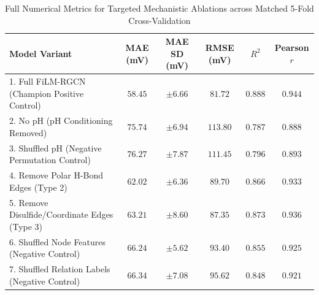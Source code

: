 \begin{table}[htbp]
\centering
\caption{Full Numerical Metrics for Targeted Mechanistic Ablations across Matched 5-Fold Cross-Validation}
\label{tab:s1_ablations}
\small
\begin{tabular*}{\textwidth}{@{\extracolsep{\fill}}lccccc@{}}
\toprule
Model Variant & MAE (mV) & MAE SD (mV) & RMSE (mV) & $R^2$ & Pearson $r$ \\
\midrule
1. Full FiLM-RGCN (Champion Positive Control) & $\mathbf{58.45}$ & $\pm 6.66$ & $\mathbf{81.72}$ & $\mathbf{0.888}$ & $\mathbf{0.944}$ \\
2. No pH (pH Conditioning Removed) & $75.74$ & $\pm 6.94$ & $113.80$ & $0.787$ & $0.888$ \\
3. Shuffled pH (Negative Permutation Control) & $76.27$ & $\pm 7.87$ & $111.45$ & $0.796$ & $0.893$ \\
4. Remove Polar H-Bond Edges (Type 2) & $62.02$ & $\pm 6.36$ & $89.70$ & $0.866$ & $0.933$ \\
5. Remove Disulfide/Coordinate Edges (Type 3) & $63.21$ & $\pm 8.60$ & $87.35$ & $0.873$ & $0.936$ \\
6. Shuffled Node Features (Negative Control) & $66.24$ & $\pm 5.62$ & $93.40$ & $0.855$ & $0.925$ \\
7. Shuffled Relation Labels (Negative Control) & $66.34$ & $\pm 7.08$ & $95.62$ & $0.848$ & $0.921$ \\
\bottomrule
\end{tabular*}
\end{table}
